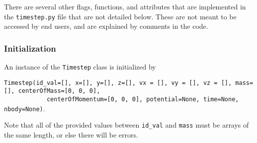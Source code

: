 \documentclass{article}
\begin{document}
There are several other flags, functions, and attributes that are implemented in the \verb!timestep.py! file that are not detailed below. These are not meant to be accessed by end users, and are explained by comments in the code.

\subsubsection{Initialization}

An instance of the \verb!Timestep! class is initialized by 

\verb!Timestep(id_val=[], x=[], y=[], z=[], vx = [], vy = [], vz = [], mass=[], centerOfMass=[0, 0, 0],! \\ \verb!            centerOfMomentum=[0, 0, 0], potential=None, time=None, nbody=None)!.

Note that all of the provided values between \verb!id_val! and \verb!mass! must be arrays of the same length, or else there will be errors. 
\end{document}
